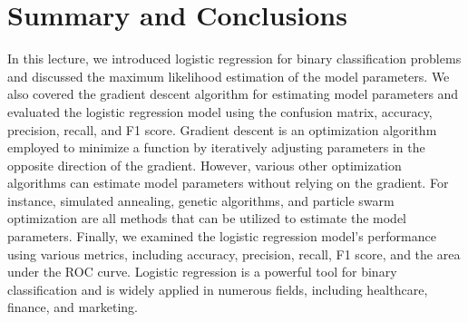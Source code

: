 \documentclass{article}[11pt]
\begin{document}
\section{Summary and Conclusions}
In this lecture, we introduced logistic regression for binary classification problems and discussed the maximum likelihood estimation of the model parameters. We also covered the gradient descent algorithm for estimating model parameters and evaluated the logistic regression model using the confusion matrix, accuracy, precision, recall, and F1 score. Gradient descent is an optimization algorithm employed to minimize a function by iteratively adjusting parameters in the opposite direction of the gradient. However, various other optimization algorithms can estimate model parameters without relying on the gradient. For instance, simulated annealing, genetic algorithms, and particle swarm optimization are all methods that can be utilized to estimate the model parameters. Finally, we examined the logistic regression model's performance using various metrics, including accuracy, precision, recall, F1 score, and the area under the ROC curve. Logistic regression is a powerful tool for binary classification and is widely applied in numerous fields, including healthcare, finance, and marketing.



\end{document}
